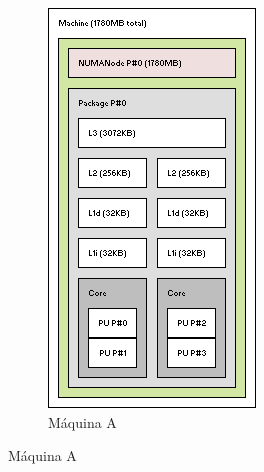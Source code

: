 \begin{figure}
	\centering
	\caption{Saída do programa lstopo sobre as máquinas utilizadas}
	\label{img:maquinas}
	\begin{subfigure}{.4\textwidth}
		\caption{Máquina A}
		\includegraphics[width=\textwidth]{rec/img/MaqA}
	\end{subfigure}

\end{figure}
